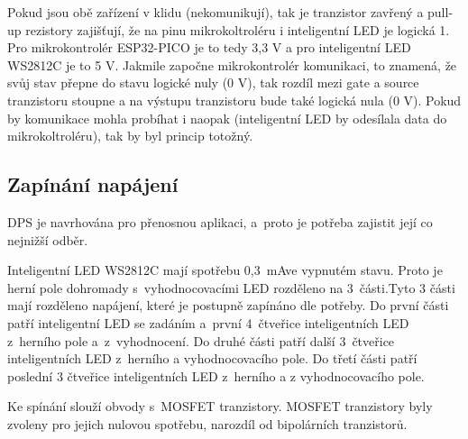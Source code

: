 
  Pokud jsou obě zařízení v klidu (nekomunikují), tak je tranzistor zavřený a pull-up rezistory zajišťují, že na pinu mikrokoltroléru
  i inteligentní LED je logická 1. Pro mikrokontrolér ESP32-PICO je to tedy 3,3 V a pro inteligentní LED WS2812C je to 5 V. Jakmile započne
  mikrokontrolér komunikaci, to znamená, že svůj stav přepne do stavu logické nuly (0 V), tak rozdíl mezi gate a source tranzistoru stoupne
  a na výstupu tranzistoru bude také logická nula (0 V). Pokud by komunikace mohla probíhat i naopak (inteligentní LED by odesílala data do
  mikrokoltroléru), tak by byl princip totožný. 

  \subsection{Zapínání napájení}
  DPS je navrhována pro přenosnou aplikaci, a~proto je potřeba zajistit její co nejnižší odběr. 

  Inteligentní LED WS2812C mají spotřebu 0,3~mAve vypnutém stavu. Proto je herní pole dohromady
  s~vyhodnocovacími LED rozděleno na 3~části.Tyto 3 části mají rozděleno napájení, které je postupně zapínáno dle potřeby. 
  Do první části patří inteligentní LED se zadáním a~první 4~čtveřice inteligentních LED 
  z~herního pole a~z~vyhodnocení. Do druhé části patří další 3~čtveřice inteligentních LED z~herního a vyhodnocovacího pole. 
  Do třetí části patří poslední 3 čtveřice inteligentních LED z~herního a z vyhodnocovacího pole.

  Ke spínání slouží obvody s~MOSFET tranzistory. MOSFET tranzistory byly zvoleny pro jejich nulovou spotřebu, narozdíl od 
  bipolárních tranzistorů. 


